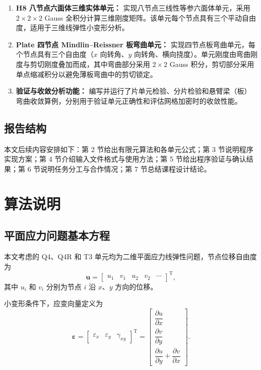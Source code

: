 \documentclass[UTF8,a4paper,zihao=-4]{ctexart}
\newcommand{\T}{\mathrm{T}}
\newcommand{\Uvec}{\bm{u}}
\newcommand{\epsvec}{\bm{\varepsilon}}
\begin{document}
\begin{enumerate}
    \item \textbf{H8 八节点六面体三维实体单元：}
    实现八节点三线性等参六面体单元，采用 $2\times2\times2$ Gauss 全积分计算三维刚度矩阵。该单元每个节点具有三个平动自由度，适用于三维线弹性小变形分析。

    \item \textbf{Plate 四节点 Mindlin--Reissner 板弯曲单元：}
    实现四节点板弯曲单元，每个节点具有三个自由度（$x$ 向转角、$y$ 向转角、横向挠度）。单元刚度由弯曲刚度与剪切刚度叠加而成，其中弯曲部分采用 $2\times2$ Gauss 积分，剪切部分采用单点缩减积分以避免薄板弯曲中的剪切锁定。

    \item \textbf{验证与收敛分析功能：}
    编写并运行了片单元检验、分片检验和悬臂梁（板）弯曲收敛算例，分别用于验证单元正确性和评估网格加密时的收敛性能。
\end{enumerate}

\subsection{报告结构}

本文后续内容安排如下：第 2 节给出有限元算法和各单元公式；第 3 节说明程序实现方案；第 4 节介绍输入文件格式与使用方法；第 5 节给出程序验证与确认结果；第 6 节说明任务分工与合作情况；第 7 节总结课程设计结论。

\section{算法说明}

\subsection{平面应力问题基本方程}

本文考虑的 Q4、Q4R 和 T3 单元均为二维平面应力线弹性问题，节点位移自由度为
\begin{equation}
    \Uvec =
    \begin{bmatrix}
        u_1 & v_1 & u_2 & v_2 & \cdots
    \end{bmatrix}^{\T},
\end{equation}
其中 $u_i$ 和 $v_i$ 分别为节点 $i$ 沿 $x$、$y$ 方向的位移。

小变形条件下，应变向量定义为
\begin{equation}
    \epsvec =
    \begin{bmatrix}
        \varepsilon_x & \varepsilon_y & \gamma_{xy}
    \end{bmatrix}^{\T}
    =
    \begin{bmatrix}
        \dfrac{\partial u}{\partial x}\\[0.5em]
        \dfrac{\partial v}{\partial y}\\[0.5em]
        \dfrac{\partial u}{\partial y}
        +
        \dfrac{\partial v}{\partial x}
    \end{bmatrix}.
\end{equation}
\end{document}

